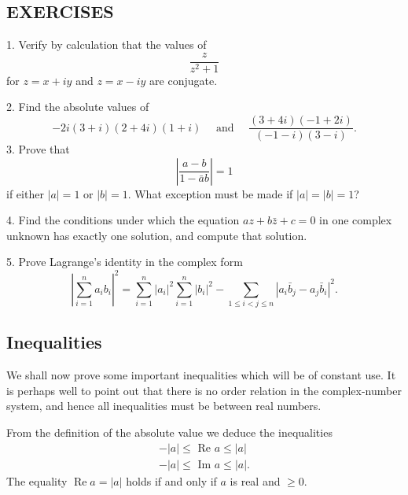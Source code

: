 \subsection*{EXERCISES}
1. Verify by calculation that the values of
\begin{equation*}
\frac {z}{z ^ {2} + 1}
\end{equation*}
for $z = x + iy$ and $z = x - iy$ are conjugate.

2. Find the absolute values of
\begin{equation*}
- 2 i (3 + i) (2 + 4 i) (1 + i) \quad \text { and } \quad \frac {(3 + 4 i) (- 1 + 2 i)}{(- 1 - i) (3 - i)}.
\end{equation*}
3. Prove that
\begin{equation*}
\left| \frac {a - b}{1 - \bar {a} b} \right| = 1
\end{equation*}
if either $|a| = 1$ or $|b| = 1$. What exception must be made if $|a| = |b| = 1$?

4. Find the conditions under which the equation $az + b\bar{z} + c = 0$ in one complex unknown has exactly one solution, and compute that solution.

5. Prove Lagrange's identity in the complex form
\begin{equation*}
\left| \sum_ {i = 1} ^ {n} a _ {i} b _ {i} \right| ^ {2} = \sum_ {i = 1} ^ {n} | a _ {i} | ^ {2} \sum_ {i = 1} ^ {n} | b _ {i} | ^ {2} - \sum_ {1 \leq i <   j \leq n} | a _ {i} \bar {b} _ {j} - a _ {j} \bar {b} _ {i} | ^ {2}.
\end{equation*}
\setcounter{section}{1}\setcounter{subsection}{4}\subsection{Inequalities}\label{sec:1.1.5}
We shall now prove some important inequalities which will be of constant use. It is perhaps well to point out that there is no order relation in the complex-number system, and hence all inequalities must be between real numbers.

From the definition of the absolute value we deduce the inequalities
\begin{equation*}
\begin{array}{l} - | a | \leq \text {   Re   } a \leq | a | \\ - | a | \leq \text {   Im   } a \leq | a |. \end{array}\tag{9}\label{eq:1.9}
\end{equation*}
The equality $\operatorname{Re} a = |a|$ holds if and only if $a$ is real and $\geq 0$.

